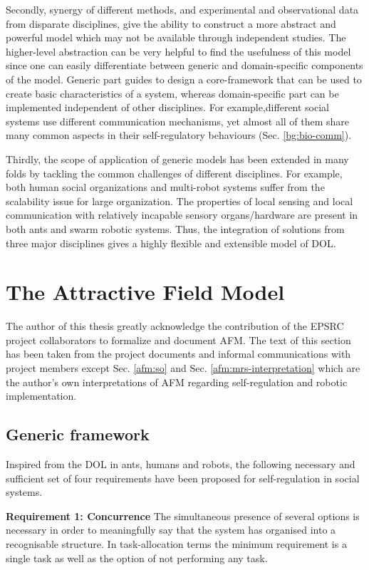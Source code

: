 Secondly, synergy of different methods, and experimental and observational data from disparate disciplines, give the ability to construct a more abstract and powerful model which may not be available through independent studies. The higher-level abstraction can be very helpful to find the usefulness of this model since one can easily differentiate between generic and domain-specific components of the model. Generic part guides  to design a core-framework that can be used to create basic characteristics of a system, whereas domain-specific part can be implemented independent of other disciplines. For example,different social systems use different communication mechanisms, yet almost all of them share many common aspects in their self-regulatory behaviours (Sec. \ref{bg:bio-comm}). 

Thirdly,  the scope of application of generic models has been extended in many folds by tackling the common challenges of different disciplines. For example, both human social organizations and multi-robot systems suffer from the scalability issue for large organization. The properties of local sensing and local communication with relatively incapable sensory organs/hardware are present in both ants and swarm robotic systems. Thus, the integration of solutions from three major disciplines gives  a highly flexible and extensible model of DOL.
\section{The Attractive Field Model}
\label{afm:model}
The author of this thesis greatly acknowledge the contribution of the EPSRC project collaborators to formalize and document AFM. The text of this section has been taken from the project documents and informal communications with project members except Sec. \ref{afm:so} and Sec. \ref{afm:mrs-interpretation} which are the author's own interpretations of AFM regarding self-regulation and robotic implementation.
\subsection{Generic framework}
\label{afm:framework}
Inspired from the DOL in ants, humans and robots,  the following necessary and sufficient set of four requirements have been proposed for self-regulation in social systems.

\textbf{Requirement 1: Concurrence} The simultaneous presence of several options is necessary in order to meaningfully say that the system has organised into a recognisable structure.   In task-allocation terms the minimum requirement is a single task as well as the option of not performing any task.

